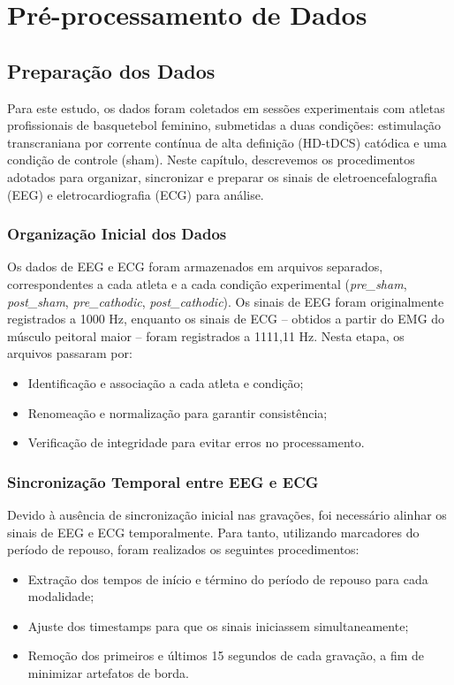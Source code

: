 \chapter{Pré-processamento de Dados}
\label{chap:preprocessamento_de_dados}

\section{Preparação dos Dados}
Para este estudo, os dados foram coletados em sessões experimentais com atletas profissionais de basquetebol feminino, submetidas a duas condições: estimulação transcraniana por corrente contínua de alta definição (HD-tDCS) catódica e uma condição de controle (sham). Neste capítulo, descrevemos os procedimentos adotados para organizar, sincronizar e preparar os sinais de eletroencefalografia (EEG) e eletrocardiografia (ECG) para análise.

\subsection{Organização Inicial dos Dados}
Os dados de EEG e ECG foram armazenados em arquivos separados, correspondentes a cada atleta e a cada condição experimental (\textit{pre\_sham}, \textit{post\_sham}, \textit{pre\_cathodic}, \textit{post\_cathodic}). Os sinais de EEG foram originalmente registrados a 1000 Hz, enquanto os sinais de ECG – obtidos a partir do EMG do músculo peitoral maior – foram registrados a 1111,11 Hz. Nesta etapa, os arquivos passaram por:
\begin{itemize}
    \item Identificação e associação a cada atleta e condição;
    \item Renomeação e normalização para garantir consistência;
    \item Verificação de integridade para evitar erros no processamento.
\end{itemize}

\subsection{Sincronização Temporal entre EEG e ECG}

Devido à ausência de sincronização inicial nas gravações, foi necessário alinhar os sinais de EEG e ECG temporalmente. Para tanto, utilizando marcadores do período de repouso, foram realizados os seguintes procedimentos:

\begin{itemize}
    \item Extração dos tempos de início e término do período de repouso para cada modalidade;
    \item Ajuste dos timestamps para que os sinais iniciassem simultaneamente;
    \item Remoção dos primeiros e últimos 15 segundos de cada gravação, a fim de minimizar artefatos de borda.
\end{itemize}

